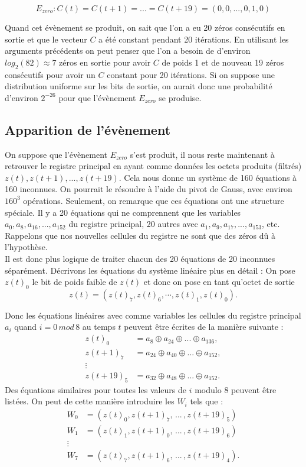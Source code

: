 \documentclass[11pt]{report}
\begin{document}
$$
E_{zero} : C(t) = C(t+1) = ... = C(t+19) = (0,0,...,0,1,0)
$$

Quand cet évènement se produit, on sait que l'on a eu 20 zéros consécutifs en sortie et que le vecteur $C$ a été constant pendant 20 itérations. En utilisant les arguments précédents on peut penser que l'on a besoin de d'environ $log_2(82) \approx 7$ zéros en sortie pour avoir $C$ de poids 1 et de nouveau 19 zéros consécutifs pour avoir un $C$ constant pour 20 itérations. Si on suppose une distribution uniforme sur les bits de sortie, on aurait donc une probabilité d'environ $2^{-26}$ pour que l'évènement $E_{zero}$ se produise. 

\subsection{Apparition de l'évènement}

On suppose que l'évènement $E_{zero}$ s'est produit, il nous reste maintenant à retrouver le registre principal en ayant comme données les octets produits (filtrés) $z(t),z(t+1),...,z(t+19)$. Cela nous donne un système de 160 équations à 160 inconnues. On pourrait le résoudre à l'aide du pivot de Gauss, avec environ $160^3$ opérations. 
Seulement, on remarque que ces équations ont une structure spéciale.
Il y a 20 équations qui ne comprennent que les variables $a_0,a_8,a_{16},...,a_{152}$ du registre principal, 20 autres avec $a_1,a_9,a_{17},...,a_{153}$, etc. Rappelons que nos nouvelles cellules du registre ne sont que des zéros dû à l'hypothèse. 
\\
Il est donc plus logique de traiter chacun des 20 équations de 20 inconnues séparément. Décrivons les équations du système linéaire plus en détail : 
On pose $z(t)_0$ le bit de poids faible de $z(t)$ et donc on pose en tant qu'octet de sortie 
$$
z(t) = (z(t)_7,z(t)_6,\cdots ,z(t)_1,z(t)_0).
$$
 
Donc les équations linéaires avec comme variables les cellules du registre principal $a_i$ quand $i = 0 \, mod \, 8$ au temps $t$ peuvent être écrites de la manière suivante :
\begin{align*}
z(t)_0 &= a_8 \oplus a_{24} \oplus ... \oplus a_{136},\\
z(t+1)_7 &= a_{24} \oplus a_{40} \oplus ... \oplus a_{152},\\
\vdots\\
z(t+19)_5 &= a_{32} \oplus a_{48} \oplus ... \oplus a_{152}.
\end{align*}
Des équations similaires pour toutes les valeurs de $i$ modulo 8 peuvent être listées. On peut de cette manière introduire les $W_i$ tels que : 
\begin{align*}
W_0 &= (z(t)_0,z(t+1)_7, \, ... \, , z(t+19)_5)\\
W_1 &= (z(t)_1,z(t+1)_0, \, ... \, , z(t+19)_6)\\
\vdots\\
W_7 &= (z(t)_7,z(t+1)_6, \, ... \, , z(t+19)_4).
\end{align*}
\end{document}
